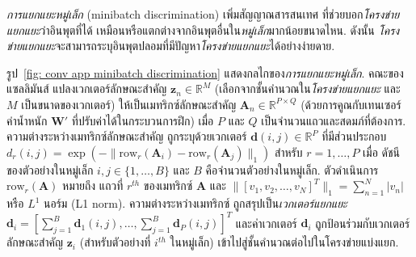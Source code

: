 \textit{การแยกแยะหมู่เล็ก} (minibatch discrimination)%
เพิ่มสัญญาณสารสนเทศ ที่ช่วยบอก\textit{โครงข่ายแยกแยะ}ว่าอินพุตที่ได้ เหมือนหรือแตกต่างจากอินพุตอื่นใน\textit{หมู่เล็ก}มากน้อยขนาดไหน.
ดังนั้น \textit{โครงข่ายแยกแยะ}จะสามารถระบุอินพุตปลอมที่มีปัญหา\textit{โครงข่ายแยกแยะ}ได้อย่างง่ายดาย.

รูป~\ref{fig: conv app minibatch discrimination} แสดงกลไกของ\textit{การแยกแยะหมู่เล็ก}.
คณะของแซลลิมันส์\cite{SalimansEtAl2016} แปลงเวกเตอร์ลักษณะสำคัญ $\bm{z}_n \in \mathbb{R}^M$ 
(เลือกจากชั้นคำนวณใน\textit{โครงข่ายแยกแยะ} และ $M$ เป็นขนาดของเวกเตอร์)
ให้เป็นเมทริกซ์ลักษณะสำคัญ $\bm{A}_n \in \mathbb{R}^{P \times Q}$ (ด้วยการคูณกับเทนเซอร์ค่าน้ำหนัก $\bm{W}'$ ที่ปรับค่าได้ในกระบวนการฝึก)
เมื่อ $P$ และ $Q$ เป็นจำนวนแถวและสดมภ์ที่ต้องการ.
ความต่างระหว่างเมทริกซ์ลักษณะสำคัญ ถูกระบุด้วยเวกเตอร์ $\bm{d}(i,j) \in \mathbb{R}^P$ ที่มีส่วนประกอบ 
$d_r(i,j) = \exp( - \| \mathrm{row}_r(\bm{A}_i) - \mathrm{row}_r(\bm{A}_j)\|_1)$
สำหรับ $r = 1, \ldots, P$ เมื่อ ดัชนีของตัวอย่างในหมู่เล็ก $i, j \in \{1, \ldots, B\}$ และ $B$ คือจำนวนตัวอย่างในหมู่เล็ก.
ตัวดำเนินการ $\mathrm{row}_r(\bm{A})$ หมายถึง แถวที่ $r^{th}$ ของเมทริกซ์ $\bm{A}$
และ $\| [v_1, v_2, \ldots, v_N]^T \|_1 = \sum_{n=1}^N |v_n|$ หรือ $L^1$ นอร์ม (L1 norm). 
ความต่างระหว่างเมทริกซ์ ถูกสรุปเป็น\textit{เวกเตอร์แยกแยะ} $\bm{d}_i = [\sum_{j=1}^B \bm{d}_1(i,j), \ldots,  \sum_{j=1}^B \bm{d}_P(i,j)]^T$
และค่าเวกเตอร์ $\bm{d}_i$ ถูกป้อนร่วมกับเวกเตอร์ลักษณะสำคัญ $\bm{z}_i$ (สำหรับตัวอย่างที่ $i^{th}$ ในหมู่เล็ก) เข้าไปสู่ชั้นคำนวณต่อไปในโครงข่ายแบ่งแยก.

%
%


